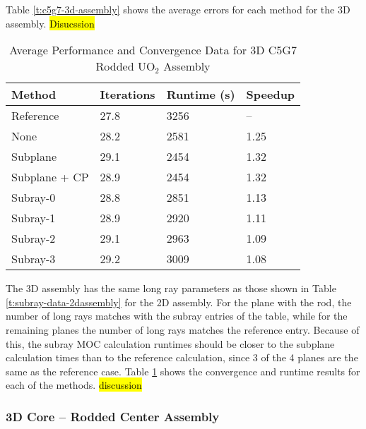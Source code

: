 Table \ref{t:c5g7-3d-assembly} shows the average errors for each method for the 3D assembly.  \hl{Disucssion}

\begin{table}[h]
    \centering
    \caption[3D C5G7 UO$_2$ Assembly Performance]{Average Performance and Convergence Data for 3D C5G7 Rodded UO$_2$ Assembly}\label{t:subray-performance-3Dassembly}
    \begin{tabular}{l l l l}\toprule
        Method & Iterations & Runtime (s) & Speedup \\\midrule
Reference     & 27.8 & 3256 & --   \\
None          & 28.2 & 2581 & 1.25 \\
Subplane      & 29.1 & 2454 & 1.32 \\
Subplane + CP & 28.9 & 2454 & 1.32 \\
Subray-0      & 28.8 & 2851 & 1.13 \\
Subray-1      & 28.9 & 2920 & 1.11 \\
Subray-2      & 29.1 & 2963 & 1.09 \\
Subray-3      & 29.2 & 3009 & 1.08 \\
        \bottomrule
    \end{tabular}
\end{table}

The 3D assembly has the same long ray parameters as those shown in Table \ref{t:subray-data-2dassembly} for the 2D assembly.  For the plane with the rod, the number of long rays matches with the subray entries of the table, while for the remaining planes the number of long rays matches the reference entry.  Because of this, the subray MOC calculation runtimes should be closer to the subplane calculation times than to the reference calculation, since 3 of the 4 planes are the same as the reference case.  Table \ref{t:subray-performance-3Dassembly} shows the convergence and runtime results for each of the methods.  \hl{discussion}

\subsubsection{3D Core -- Rodded Center Assembly}

